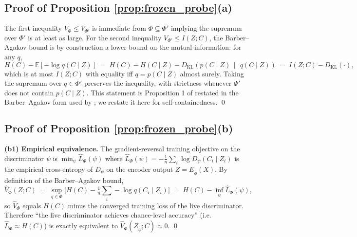 \documentclass{article}
\begin{document}
\subsection{Proof of Proposition \ref{prop:frozen_probe}(a)}

The first inequality $V_\Phi \le V_{\Phi'}$ is immediate from $\Phi \subseteq \Phi'$ implying the supremum over $\Phi'$ is at least as large. For the second inequality $V_{\Phi'} \le I(Z; C)$, the Barber--Agakov bound is by construction a lower bound on the mutual information: for any $q$,
\begin{equation}
H(C) - \mathbb{E}[-\log q(C \mid Z)] \;=\; H(C) - H(C \mid Z) - D_{\mathrm{KL}}(p(C \mid Z) \,\|\, q(C \mid Z)) \;=\; I(Z; C) - D_{\mathrm{KL}}(\cdot),
\end{equation}
which is at most $I(Z; C)$ with equality iff $q = p(C \mid Z)$ almost surely. Taking the supremum over $q \in \Phi'$ preserves the inequality, with strictness whenever $\Phi'$ does not contain $p(C \mid Z)$. This statement is Proposition 1 of \citet{xu2020theory} restated in the Barber--Agakov form used by \citet{pimentel2020information}; we restate it here for self-containedness. \qed

\subsection{Proof of Proposition \ref{prop:frozen_probe}(b)}

\textbf{(b1) Empirical equivalence.} The gradient-reversal training objective on the discriminator $\psi$ is $\min_\psi \hat L_\Phi(\psi)$ where $\hat L_\Phi(\psi) = -\frac{1}{n}\sum_i \log D_\psi(C_i \mid Z_i)$ is the empirical cross-entropy of $D_\psi$ on the encoder output $Z = E_{\hat\phi}(X)$. By definition of the Barber--Agakov bound,
\begin{equation}
\hat V_\Phi(Z; C) \;=\; \sup_{q \in \Phi} \big[H(C) - \tfrac{1}{n}\sum_i -\log q(C_i \mid Z_i)\big] \;=\; H(C) - \inf_{\psi} \hat L_\Phi(\psi),
\end{equation}
so $\hat V_\Phi$ equals $H(C)$ minus the converged training loss of the live discriminator. Therefore ``the live discriminator achieves chance-level accuracy'' (i.e.\ $\hat L_\Phi \approx H(C)$) is exactly equivalent to $\hat V_\Phi(Z_{\hat\phi}; C) \approx 0$. \qed
\end{document}
